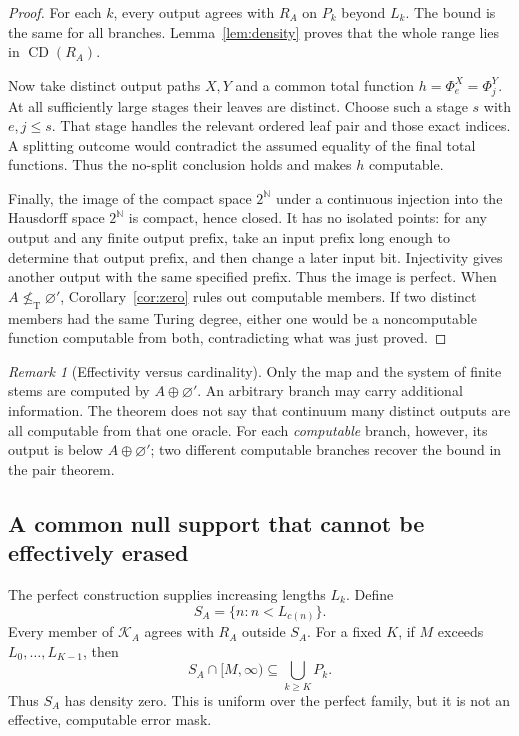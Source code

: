 \documentclass[11pt,a4paper]{article}
\newcommand{\N}{\mathbb N}
\newcommand{\nleT}{\nleq_{\mathrm T}}
\newcommand{\CD}{\operatorname{CD}}
\theoremstyle{definition}\newtheorem{definition}[theorem]{Definition}
\theoremstyle{remark}\newtheorem{remark}[theorem]{Remark}
\begin{document}
\begin{proof}
For each $k$, every output agrees with $R_A$ on $P_k$ beyond $L_k$. The bound is the same for all branches. Lemma~\ref{lem:density} proves that the whole range lies in $\CD(R_A)$.

Now take distinct output paths $X,Y$ and a common total function $h=\Phi_e^X=\Phi_j^Y$. At all sufficiently large stages their leaves are distinct. Choose such a stage $s$ with $e,j\leq s$. That stage handles the relevant ordered leaf pair and those exact indices. A splitting outcome would contradict the assumed equality of the final total functions. Thus the no-split conclusion holds and makes $h$ computable.

Finally, the image of the compact space $2^{\N}$ under a continuous injection into the Hausdorff space $2^{\N}$ is compact, hence closed. It has no isolated points: for any output and any finite output prefix, take an input prefix long enough to determine that output prefix, and then change a later input bit. Injectivity gives another output with the same specified prefix. Thus the image is perfect. When $A\nleT\varnothing'$, Corollary~\ref{cor:zero} rules out computable members. If two distinct members had the same Turing degree, either one would be a noncomputable function computable from both, contradicting what was just proved.
\end{proof}

\begin{remark}[Effectivity versus cardinality]
Only the map and the system of finite stems are computed by $A\oplus\varnothing'$. An arbitrary branch may carry additional information. The theorem does not say that continuum many distinct outputs are all computable from that one oracle. For each \emph{computable} branch, however, its output is below $A\oplus\varnothing'$; two different computable branches recover the bound in the pair theorem.
\end{remark}

\subsection{A common null support that cannot be effectively erased}
The perfect construction supplies increasing lengths $L_k$. Define
\begin{equation}\label{eq:errorsupport}
 S_A=\{n:n<L_{c(n)}\}.
\end{equation}
Every member of $\mathcal K_A$ agrees with $R_A$ outside $S_A$. For a fixed $K$, if $M$ exceeds $L_0,\ldots,L_{K-1}$, then
\[
 S_A\cap[M,\infty)\subseteq\bigcup_{k\geq K}P_k.
\]
Thus $S_A$ has density zero. This is uniform over the perfect family, but it is not an effective, computable error mask.
\end{document}
